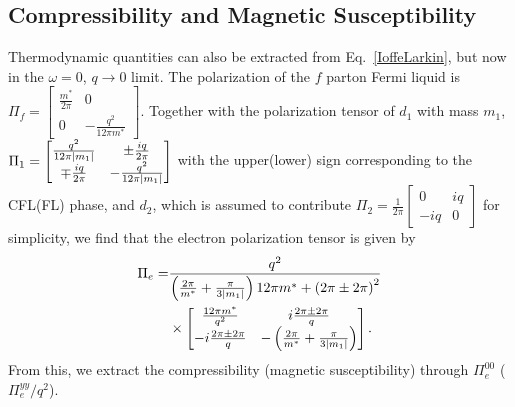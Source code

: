 \documentclass[aps,prl,twocolumn,superscriptaddress,floatfix, 10pt,longbibliography, nofootinbib]{revtex4-2}
\begin{document}
\subsection{Compressibility and Magnetic Susceptibility}
Thermodynamic quantities can also be extracted from Eq.~\eqref{IoffeLarkin}, but now in the $\omega=0$, $q\rightarrow 0$ limit. The polarization of the $f$ parton Fermi liquid is $\Pi_{f}=\begin{bmatrix}
    \frac{m^*}{2\pi} & 0\\
    0 & -\frac{q^2}{12\pi m^*}
    \end{bmatrix}$. Together with the polarization tensor of $d_1$ with mass $m_1$, $\Pi_{1}=\begin{bmatrix}
    \frac{q^2}{12\pi \abs{m_1}} & \pm\frac{iq}{2\pi}\\
    \mp\frac{iq}{2\pi} & -\frac{q^2}{12\pi \abs{m_1}}
    \end{bmatrix}$ with the upper(lower) sign corresponding to the CFL(FL) phase, and $d_2$, which is assumed to contribute $\Pi_{2}=\frac{1}{2\pi}\begin{bmatrix}
    0 & iq\\
    -iq & 0
    \end{bmatrix}$ for simplicity, we find that the electron polarization tensor is given by
    \begin{equation}
    \begin{aligned}
        \Pi_e=&\frac{q^2}{\left(\frac{2\pi}{m^*}+\frac{\pi}{3\abs{m_1}}\right)12\pi m^*+\left(2\pi\pm2\pi\right)^2}\\
        &\times\begin{bmatrix}
    \frac{12\pi m^*}{q^2} & i\frac{2\pi\pm2\pi}{q}\\
    -i\frac{2\pi\pm2\pi}{q} & -\left(\frac{2\pi}{m^*}+\frac{\pi}{3\abs{m_1}}\right)
    \end{bmatrix}.
    \end{aligned}
    \end{equation}
From this, we extract the compressibility (magnetic susceptibility) through $\Pi_e^{00}$ ($\Pi_e^{yy}/q^2$).
\end{document}
